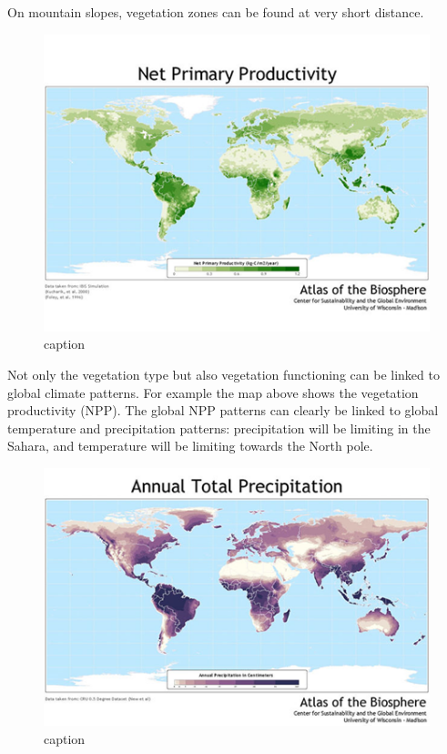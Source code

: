 \documentclass[12pt,oneside]{book}
\begin{document}
On mountain slopes, vegetation zones can be found at very short
distance.

\begin{figure}

{\centering \includegraphics[width=0.8\linewidth]{figures/Figure810} 

}

\caption{caption}\label{fig:Vegetationzones5}
\end{figure}

Not only the vegetation type but also vegetation functioning can be
linked to global climate patterns. For example the map above shows the
vegetation productivity (NPP). The global NPP patterns can clearly be
linked to global temperature and precipitation patterns: precipitation
will be limiting in the Sahara, and temperature will be limiting towards
the North pole.

\begin{figure}

{\centering \includegraphics[width=0.8\linewidth]{figures/Figure811} 

}

\caption{caption}\label{fig:Vegetationzones6}
\end{figure}
\end{document}
